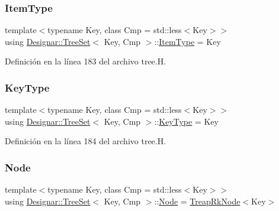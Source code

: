 \subsubsection{\texorpdfstring{Item\+Type}{ItemType}}
{\footnotesize\ttfamily template$<$typename Key, class Cmp = std\+::less$<$\+Key$>$$>$ \\
using \hyperlink{class_designar_1_1_tree_set}{Designar\+::\+Tree\+Set}$<$ Key, Cmp $>$\+::\hyperlink{class_designar_1_1_tree_set_a3d4237612f151579b02ff5c7735df07a}{Item\+Type} =  Key}



Definición en la línea 183 del archivo tree.\+H.

\mbox{\label{class_designar_1_1_tree_set_a28d9821de526b7d05f199b2d5d308335}} 
\subsubsection{\texorpdfstring{Key\+Type}{KeyType}}
{\footnotesize\ttfamily template$<$typename Key, class Cmp = std\+::less$<$\+Key$>$$>$ \\
using \hyperlink{class_designar_1_1_tree_set}{Designar\+::\+Tree\+Set}$<$ Key, Cmp $>$\+::\hyperlink{class_designar_1_1_tree_set_a28d9821de526b7d05f199b2d5d308335}{Key\+Type} =  Key}



Definición en la línea 184 del archivo tree.\+H.

\mbox{\label{class_designar_1_1_tree_set_a7409a9c1545c0e9e2fd6b84120713c99}} 
\subsubsection{\texorpdfstring{Node}{Node}}
{\footnotesize\ttfamily template$<$typename Key, class Cmp = std\+::less$<$\+Key$>$$>$ \\
using \hyperlink{class_designar_1_1_tree_set}{Designar\+::\+Tree\+Set}$<$ Key, Cmp $>$\+::\hyperlink{class_designar_1_1_tree_set_a7409a9c1545c0e9e2fd6b84120713c99}{Node} =  \hyperlink{class_designar_1_1_treap_rk_node}{Treap\+Rk\+Node}$<$Key$>$}



